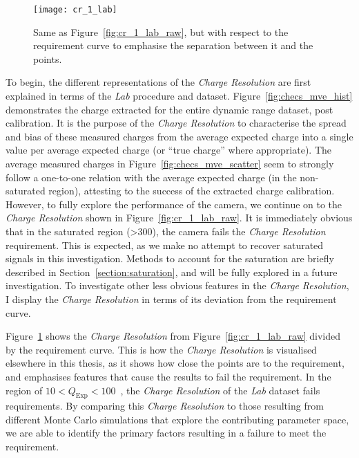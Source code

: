 \begin{figure}
	\centering
    \texttt{[image: cr\_1\_lab]} 
	\caption[\textit{Charge Resolution} of the Lab dataset with respect to the requirement.]{Same as Figure~\ref{fig:cr_1_lab_raw}, but with respect to the requirement curve to emphasise the separation between it and the points.}
	\label{fig:cr_1_lab}
\end{figure}

To begin, the different representations of the \textit{Charge Resolution} are first explained in terms of the \textit{Lab} procedure and dataset. Figure~\ref{fig:checs_mve_hist} demonstrates the charge extracted for the entire dynamic range dataset, post calibration. It is the purpose of the \textit{Charge Resolution} to characterise the spread and bias of these measured charges from the average expected charge into a single value per average expected charge (or ``true charge'' where appropriate). The average measured charges in Figure~\ref{fig:checs_mve_scatter} seem to strongly follow a one-to-one relation with the average expected charge (in the non-saturated region), attesting to the success of the extracted charge calibration. However, to fully explore the performance of the camera, we continue on to the \textit{Charge Resolution} shown in Figure~\ref{fig:cr_1_lab_raw}. It is immediately obvious that in the saturated region (\SI{>300}{\pe}), the camera fails the \textit{Charge Resolution} requirement. This is expected, as we make no attempt to recover saturated signals in this investigation. Methods to account for the saturation are briefly described in Section~\ref{section:saturation}, and will be fully explored in a future investigation. To investigate other less obvious features in the \textit{Charge Resolution}, I display the \textit{Charge Resolution} in terms of its deviation from the requirement curve.

Figure~\ref{fig:cr_1_lab} shows the \textit{Charge Resolution} from Figure~\ref{fig:cr_1_lab_raw} divided by the requirement curve. This is how the \textit{Charge Resolution} is visualised elsewhere in this thesis, as it shows how close the points are to the requirement, and emphasises features that cause the results to fail the requirement. In the region of $10 < Q_\text{Exp} < 100$~\si{\pe}, the \textit{Charge Resolution} of the \textit{Lab} dataset fails requirements. By comparing this \textit{Charge Resolution} to those resulting from different Monte Carlo simulations that explore the contributing parameter space, we are able to identify the primary factors resulting in a failure to meet the requirement.

